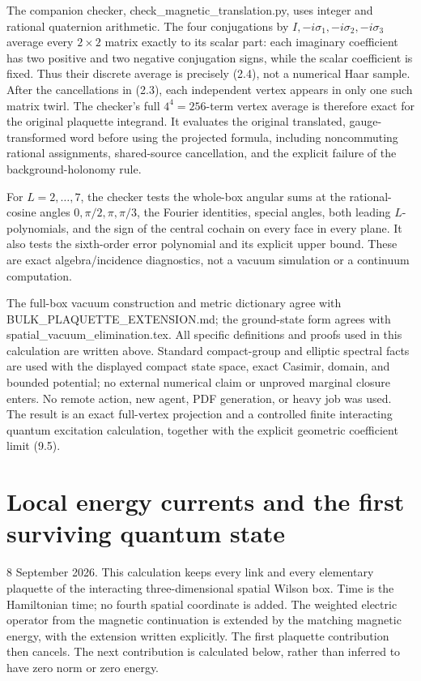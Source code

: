 \documentclass[
  11pt,
]{article}
\begin{document}
The companion checker, check\_magnetic\_translation.py, uses integer and
rational quaternion arithmetic. The four conjugations by
\(I,-i\sigma_1,-i\sigma_2,-i\sigma_3\) average every \(2\times2\) matrix
exactly to its scalar part: each imaginary coefficient has two positive
and two negative conjugation signs, while the scalar coefficient is
fixed. Thus their discrete average is precisely (2.4), not a numerical
Haar sample. After the cancellations in (2.3), each independent vertex
appears in only one such matrix twirl. The checker's full
\(4^4=256\)-term vertex average is therefore exact for the original
plaquette integrand. It evaluates the original translated,
gauge-transformed word before using the projected formula, including
noncommuting rational assignments, shared-source cancellation, and the
explicit failure of the background-holonomy rule.

For \(L=2,\ldots,7\), the checker tests the whole-box angular sums at
the rational-cosine angles \(0,\pi/2,\pi,\pi/3\), the Fourier
identities, special angles, both leading \(L\)-polynomials, and the sign
of the central cochain on every face in every plane. It also tests the
sixth-order error polynomial and its explicit upper bound. These are
exact algebra/incidence diagnostics, not a vacuum simulation or a
continuum computation.

The full-box vacuum construction and metric dictionary agree with
BULK\_PLAQUETTE\_EXTENSION.md; the ground-state form agrees with
spatial\_vacuum\_elimination.tex. All specific definitions and proofs
used in this calculation are written above. Standard compact-group and
elliptic spectral facts are used with the displayed compact state space,
exact Casimir, domain, and bounded potential; no external numerical
claim or unproved marginal closure enters. No remote action, new agent,
PDF generation, or heavy job was used. The result is an exact
full-vertex projection and a controlled finite interacting quantum
excitation calculation, together with the explicit geometric coefficient
limit (9.5).

\clearpage
\section{Local energy currents and the first surviving quantum
state}\label{magnetic-part-3-local-energy-currents-and-the-first-surviving-quantum-state}

8 September 2026. This calculation keeps every link and every elementary
plaquette of the interacting three-dimensional spatial Wilson box. Time
is the Hamiltonian time; no fourth spatial coordinate is added. The
weighted electric operator from the magnetic continuation is extended by
the matching magnetic energy, with the extension written explicitly. The
first plaquette contribution then cancels. The next contribution is
calculated below, rather than inferred to have zero norm or zero energy.
\end{document}

